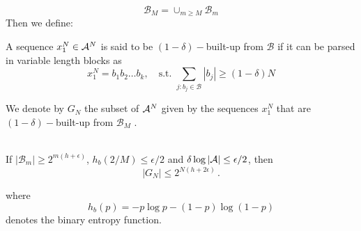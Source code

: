 \begin{equation*}
    \mathcal{B}_M = \cup_{m \geq M} \mathcal{B}_m
\end{equation*}
Then we define:
\begin{definition}
    A sequence $x_1^N \in \mathcal{A}^N$ is said to be $(1- \delta)-$built-up from $\mathcal{B}$ if it can be parsed in variable length blocks as 
    \begin{equation}
        x_1^N= b_1b_2\dots b_k, \quad \text{s.t.} \, \, \sum_{j: b_j \in \mathcal{B}} |b_j| \geq (1-\delta)N
    \end{equation}
\end{definition}
We denote by $G_N$ the subset of $\mathcal{A}^N$ given by the sequences $x_1^N$ that are $(1-\delta)-$built-up from $\mathcal{B}_M$ .
\begin{lemma}
\hfill \\
    If $|\mathcal{B}_m| \geq 2^{m (h+\epsilon)}$, $h_b(2/M) \leq \epsilon/2$ and $\delta \log |\mathcal{A}| \leq \epsilon/2$, then 
    \begin{equation*}
        |G_N| \leq 2^{N(h + 2\epsilon)}\, .
    \end{equation*}
\end{lemma}
where 
\begin{equation}
\label{eq:binary_entropy}
    h_b(p) = -p \log p - (1-p) \log(1-p)
\end{equation}
denotes the binary entropy function.
